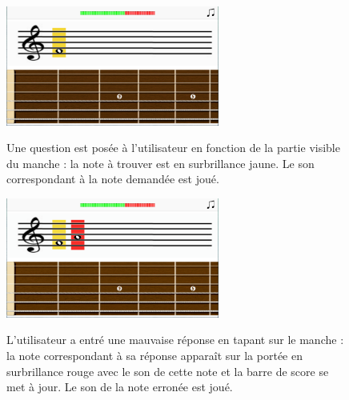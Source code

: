 \documentclass{scrreprt}
\begin{document}
\bigbreak
\begin{figure}[!ht]
  \begin{minipage}{0.55\linewidth}
    \includegraphics[width=7cm]{images/maquette_usecase/portee/question_une_note_1.png}
  \end{minipage}\hfill
  \begin{minipage}{0.5\linewidth}
  {Une question est posée à l'utilisateur en fonction de la partie visible du manche : la note à trouver est en surbrillance jaune. 
  Le son correspondant à la note demandée est joué.}
   \end{minipage}
\end{figure}



\begin{figure}[!ht]
  \begin{minipage}{0.55\linewidth}
    \includegraphics[width=7cm]{images/maquette_usecase/portee/question_mauvaise_reponse.png}
  \end{minipage}\hfill
 \begin{minipage}{0.5\linewidth}
  {L'utilisateur a entré une mauvaise réponse en tapant sur le manche : la note correspondant à sa réponse apparaît sur la portée en surbrillance rouge avec le son de cette note et la barre de score se met à jour. Le son de la note erronée est joué.}
   \end{minipage}
\end{figure}

\bigbreak
\end{document}
